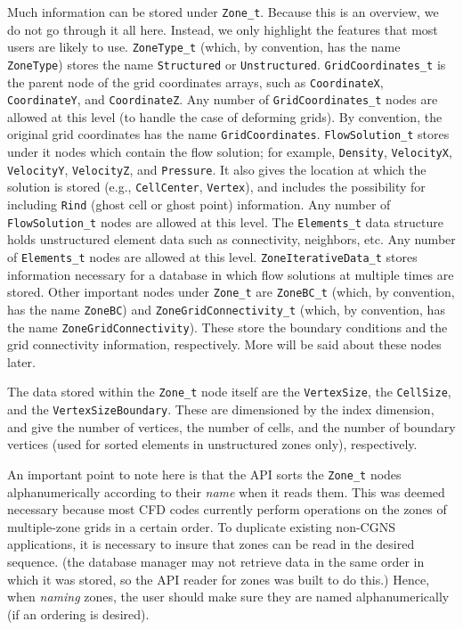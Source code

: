 \documentclass[12pt]{article}
\begin{document}
Much information can be stored under {\tt Zone\_t}.  Because this is
an overview, we do not go through it all here.  Instead, we only
highlight the features that most users are likely to use. 
{\tt ZoneType\_t} (which, by convention, has the name {\tt ZoneType})
stores the name {\tt Structured} or {\tt Unstructured}.
{\tt GridCoordinates\_t} is the parent node of the grid coordinates 
arrays, such as
{\tt CoordinateX}, {\tt CoordinateY}, 
and {\tt CoordinateZ}.  
Any number of {\tt GridCoordinates\_t} nodes are
allowed at this level (to handle the case of deforming
grids).  By convention, the original grid coordinates
has the name {\tt GridCoordinates}.
{\tt FlowSolution\_t} stores under it nodes which contain the flow
solution; for example, {\tt Density}, {\tt VelocityX}, 
{\tt VelocityY},
{\tt VelocityZ}, and {\tt Pressure}.  It also gives the location
at which the solution is stored (e.g., {\tt CellCenter}, {\tt Vertex}), and
includes the possibility for including {\tt Rind} (ghost cell or ghost point) information.
Any number of {\tt FlowSolution\_t} nodes are
allowed at this level.  The {\tt Elements\_t} data structure holds
unstructured element data such as connectivity, neighbors,
etc.  Any number of 
{\tt Elements\_t} nodes are allowed at this level.
{\tt ZoneIterativeData\_t} stores information necessary
for a database in which flow solutions at multiple times are stored.
Other important nodes under {\tt Zone\_t} are {\tt ZoneBC\_t}
(which, by convention, has the name {\tt ZoneBC})
and {\tt ZoneGridConnectivity\_t} (which, by convention, has the name 
{\tt ZoneGridConnectivity}).  These store the boundary conditions and
the grid connectivity information, respectively.
More will be said about these nodes later.

The data stored within the {\tt Zone\_t} node itself are the
{\tt VertexSize}, the {\tt CellSize}, and the {\tt VertexSizeBoundary}.  These
are dimensioned by the index dimension, and give the number
of vertices, the number of cells, and the number of boundary
vertices (used for sorted elements in unstructured zones only),
respectively.

An important point to note here is that the API sorts the {\tt Zone\_t}
nodes alphanumerically according to their {\it name} when
it reads them.  This
was deemed necessary because most CFD codes currently perform
operations on the zones of multiple-zone grids in a certain order.
To duplicate existing non-CGNS applications, it is 
necessary to insure that zones can be read in the desired
sequence.  (the database manager may not retrieve data in the same
order in which it was stored, so the API reader for zones was
built to do this.)  Hence, when {\it naming} zones, the user should
make sure they are named alphanumerically (if an ordering is
desired).
\end{document}
